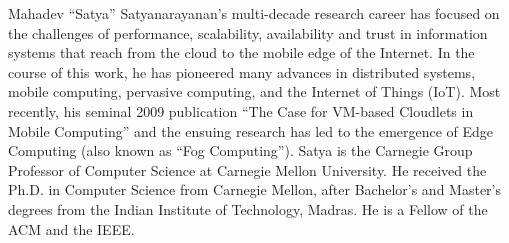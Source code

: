 \begin{IEEEbiography}%
    Mahadev ``Satya'' Satyanarayanan's multi-decade research career has focused on the challenges of performance, scalability, availability and trust in information systems that reach from the cloud to the mobile edge of the Internet.
    In the course of this work, he has pioneered many advances in distributed systems, mobile computing, pervasive computing, and the Internet of Things (IoT).
    Most recently, his seminal 2009 publication ``The Case for VM-based Cloudlets in Mobile Computing'' and the ensuing research has  led to the emergence of Edge Computing (also known as ``Fog Computing'').
    Satya is the Carnegie Group Professor of Computer Science at Carnegie Mellon University.
    He received the Ph.D. in Computer Science from Carnegie Mellon, after Bachelor's and Master's degrees from the Indian Institute of Technology, Madras.
    He is a Fellow of the ACM and the IEEE.
\end{IEEEbiography}
\newpage%
